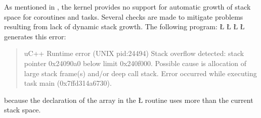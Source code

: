 \documentclass[openright,twoside]{report}
\begin{document}
\begin{comment}
When a coroutine (or task) is created, there must be sufficient memory to allocate its execution state.
The following program:
\LGinlinefalse\LGbegin\lgrinde
\L{\LB{\K{unsigned}\0\K{int}\0\V{uMainStackSize}()\0\{}}
\L{\LB{}\Tab{4}{\K{return}\01000000000;}\Tab{28}{\C{}\1\1\0very\0large\0stack\0size\0for\0main}}
\CE{}\L{\LB{\}}}
\L{\LB{\K{int}\0\V{main}()\0\{\}}}
\endlgrinde\LGend
generates this error:
\begin{quote}
\BGfont
uC++ Runtime error (UNIX pid:24848) Attempt to allocate 1000000000 bytes of storage for coroutine or task execution-state but insufficient memory available.
Error occurred while executing task uBootTask (0x4d6b0).
\end{quote}
because the declaration of the \Index{program main} by the \LGinlinetrue\LGbegin\lgrinde\L{\LB{\V{uBootTask}}}\endlgrinde\LGend{} fails due to the request for a 1000000000-byte stack\index{stack!overflow} for \LGinlinetrue\LGbegin\lgrinde\L{\LB{\V{main}}}\endlgrinde\LGend{}.
\end{comment}

As mentioned in , the \uC kernel provides no support for automatic growth of stack space for coroutines and tasks.
Several checks are made to mitigate problems resulting from lack of dynamic stack growth.
The following program:
\LGinlinefalse\LGbegin\lgrinde
\L{}
\L{\LB{}}
\CE{}\L{\LB{}}
\L{\LB{\}}}
\endlgrinde\LGend
generates this error:
\begin{quote}
\BGfont
uC++ Runtime error (UNIX pid:24494) Stack overflow detected: stack pointer 0x24090a0 below limit 0x240f000.
Possible cause is allocation of large stack frame(s) and/or deep call stack.
Error occurred while executing task main (0x7ffd314a6730).
\end{quote}
because the declaration of the array in the \LGinlinetrue\LGbegin\lgrinde\L{}\endlgrinde\LGend{} routine uses more than the current stack space.
\end{document}
